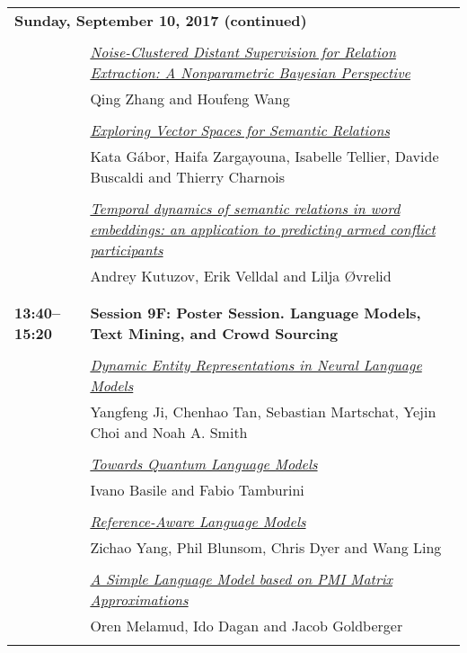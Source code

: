 \begin{tabular}{p{20mm}p{128mm}}
\\
\multicolumn{2}{l}{\bf Sunday, September 10, 2017 (continued)} \\\\
 & \hyperlink{page.1808}{\em Noise-Clustered Distant Supervision for Relation Extraction: A Nonparametric Bayesian Perspective}\\
         & Qing Zhang and Houfeng Wang \\
\\

 & \hyperlink{page.1814}{\em Exploring Vector Spaces for Semantic Relations}\\
         & Kata G\'{a}bor, Haifa Zargayouna, Isabelle Tellier, Davide Buscaldi and Thierry Charnois \\
\\

 & \hyperlink{page.1824}{\em Temporal dynamics of semantic relations in word embeddings: an application to predicting armed conflict participants}\\
         & Andrey Kutuzov, Erik Velldal and Lilja {\O}vrelid \\
\\

\\{\bf 13:40--15:20} & {\bf Session 9F: Poster Session. Language Models, Text Mining, and Crowd Sourcing } \\
\\
 & \hyperlink{page.1830}{\em Dynamic Entity Representations in Neural Language Models}\\
         & Yangfeng Ji, Chenhao Tan, Sebastian Martschat, Yejin Choi and Noah A. Smith \\
\\

 & \hyperlink{page.1840}{\em Towards Quantum Language Models}\\
         & Ivano Basile and Fabio Tamburini \\
\\

 & \hyperlink{page.1850}{\em Reference-Aware Language Models}\\
         & Zichao Yang, Phil Blunsom, Chris Dyer and Wang Ling \\
\\

 & \hyperlink{page.1860}{\em A Simple Language Model based on PMI Matrix Approximations}\\
         & Oren Melamud, Ido Dagan and Jacob Goldberger \\
\\


\end{tabular}
